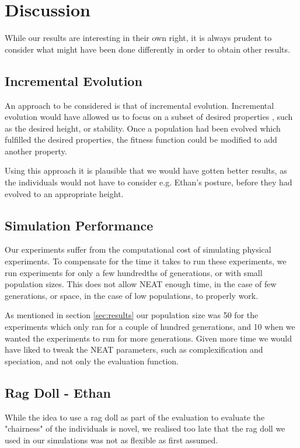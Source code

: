 \section{Discussion}
While our results are interesting in their own right, it is always prudent to 
consider what might have been done differently in order to obtain other results.

\subsection{Incremental Evolution}
An approach to be considered is that of incremental evolution. Incremental
evolution would have allowed us to focus on a subset of desired properties ,
such as the desired height, or stability. Once a population had been evolved
which fulfilled the desired properties, the fitness function could be modified
to add another property. 

Using this approach it is plausible that we would have gotten better results,
as the individuals would not have to consider e.g. Ethan's posture, before they
had evolved to an appropriate height.

\subsection{Simulation Performance}
Our experiments suffer from the computational cost of simulating physical
experiments. To compensate for the time it takes to run these experiments, we
run experiments for only a few hundredths of generations, or with small
population sizes. This does not allow NEAT enough time, in the case of few 
generations, or space, in the case of low populations, to properly work.

As mentioned in section \ref{sec:results} our population size was 50 for the 
experiments which only ran for a couple of hundred generations, and 10 when we 
wanted the experiments to run for more generations.
Given more time we would have liked to tweak the NEAT parameters, such as
complexification and speciation, and not only the evaluation function.

\subsection{Rag Doll - Ethan}
While the idea to use a rag doll as part of the evaluation to evaluate the 
"chairness" of the individuals is novel, we realised too late that the rag doll 
we used in our simulations was not as flexible as first assumed.

